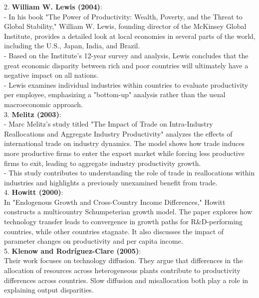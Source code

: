 \documentclass[12pt]{extarticle}
\begin{document}
2. \textbf{William W. Lewis (2004)}:\\
    - In his book "The Power of Productivity: Wealth, Poverty, and the Threat to Global Stability," William W. Lewis, founding director of the McKinsey Global Institute, provides a detailed look at local economies in several parts of the world, including the U.S., Japan, India, and Brazil.\\
    - Based on the Institute's 12-year survey and analysis, Lewis concludes that the great economic disparity between rich and poor countries will ultimately have a negative impact on all nations.\\
    - Lewis examines individual industries within countries to evaluate productivity per employee, emphasizing a "bottom-up" analysis rather than the usual macroeconomic approach.\\


3. \textbf{Melitz (2003)}:\\
   - Marc Melitz's study titled "The Impact of Trade on Intra-Industry Reallocations and Aggregate Industry Productivity" analyzes the effects of international trade on industry dynamics. The model shows how trade induces more productive firms to enter the export market while forcing less productive firms to exit, leading to aggregate industry productivity growth.\\
   - This study contributes to understanding the role of trade in reallocations within industries and highlights a previously unexamined benefit from trade.\\



4. \textbf{Howitt (2000)}:\\
In "Endogenous Growth and Cross-Country Income Differences," Howitt constructs a multicountry Schumpeterian growth model.
The paper explores how technology transfer leads to convergence in growth paths for R\&D-performing countries, while other countries stagnate.
It also discusses the impact of parameter changes on productivity and per capita income.\\


5. \textbf{Klenow and Rodríguez-Clare (2005)}:\\
Their work focuses on technology diffusion.
They argue that differences in the allocation of resources across heterogeneous plants contribute to productivity differences across countries.
Slow diffusion and misallocation both play a role in explaining output disparities.\\
\end{document}
